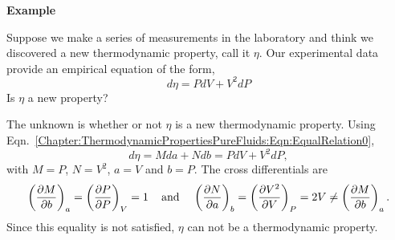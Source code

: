    \begin{MyExample}{\begin{center}{\bf Example}\end{center}}
     \begin{example}\label{Chapter:ThermodynamicPropertiesPureFluids:Example1} \citep{Balmer_Book}
         Suppose we make a series of measurements in the laboratory and think we discovered a new thermodynamic property, call it $\eta$. Our experimental data provide an empirical equation of the form,
          \begin{displaymath}
             d\eta = PdV + V^{2}dP
          \end{displaymath}
          Is $\eta$ a new property?
     \end{example}

        The unknown is whether or not $\eta$ is a new thermodynamic property. Using Eqn.~\ref{Chapter:ThermodynamicPropertiesPureFluids:Eqn:EqualRelation0},
        \begin{displaymath}
            d\eta = Mda + Ndb = PdV + V^{2}dP,
        \end{displaymath}
        with $M=P$, $N=V^{2}$, $a=V$ and $b=P$. The cross differentials are
        \begin{displaymath}
            \Partial[M]{b}{a} = \Partial[P]{P}{V} = 1\;\;\;\text{ and }\;\;\; \Partial[N]{a}{b} = \Partial[V^{2}]{V}{P} = 2V \ne \Partial[M]{b}{a}.
        \end{displaymath}
         Since this equality is not satisfied, $\eta$ can not be a thermodynamic property.
   \end{MyExample}
   
